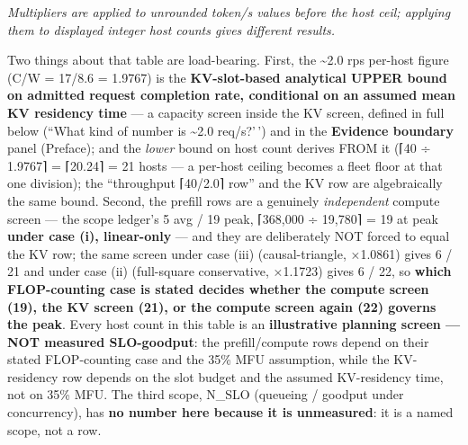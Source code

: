 \emph{Multipliers are applied to unrounded token/s values before the
host ceil; applying them to displayed integer host counts gives
different results.}

Two things about that table are load-bearing. First, the
\textasciitilde2.0 rps per-host figure (C/W = 17/8.6 = 1.9767) is the
\textbf{KV-slot-based analytical UPPER bound on admitted request
completion rate, conditional on an assumed mean KV residency time} --- a
capacity screen inside the KV screen, defined in full below (``What kind
of number is \textasciitilde2.0 req/s?'\,') and in the \textbf{Evidence
boundary} panel (Preface); and the \emph{lower} bound on host count
derives FROM it (⌈40 ÷ 1.9767⌉ = ⌈20.24⌉ = 21 hosts --- a per-host
ceiling becomes a fleet floor at that one division); the ``throughput
⌈40/2.0⌉ row'' and the KV row are algebraically the same bound. Second,
the prefill rows are a genuinely \emph{independent} compute screen ---
the scope ledger's 5 avg / 19 peak, ⌈368,000 ÷ 19,780⌉ = 19 at peak
\textbf{under case (i), linear-only} --- and they are deliberately NOT
forced to equal the KV row; the same screen under case (iii)
(causal-triangle, ×1.0861) gives 6 / 21 and under case (ii) (full-square
conservative, ×1.1723) gives 6 / 22, so \textbf{which FLOP-counting case
is stated decides whether the compute screen (19), the KV screen (21),
or the compute screen again (22) governs the peak}. Every host count in
this table is an \textbf{illustrative planning screen --- NOT measured
SLO-goodput}: the prefill/compute rows depend on their stated
FLOP-counting case and the 35\% MFU assumption, while the KV-residency
row depends on the slot budget and the assumed KV-residency time, not on
35\% MFU. The third scope, N\_SLO (queueing / goodput under
concurrency), has \textbf{no number here because it is unmeasured}: it
is a named scope, not a row.

